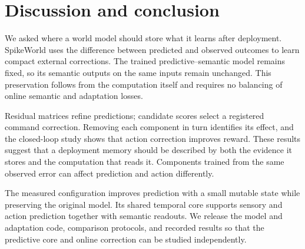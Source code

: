 \section{Discussion and conclusion}
We asked where a world model should store what it learns after deployment.
SpikeWorld uses the difference between predicted and observed outcomes to
learn compact external corrections. The trained predictive--semantic model
remains fixed, so its semantic outputs on the same inputs remain unchanged.
This preservation follows from the computation itself and requires no
balancing of online semantic and adaptation losses.

Residual matrices refine predictions; candidate scores select a registered
command correction. Removing each component in turn identifies its effect,
and the closed-loop study shows that action correction improves reward.
These results suggest that a deployment memory should be described by both
the evidence it stores and the computation that reads it. Components trained
from the same observed error can affect prediction and action differently.

The measured configuration improves prediction with a small mutable state
while preserving the original model. Its shared temporal core supports sensory
and action prediction together with semantic readouts. We release the model
and adaptation code, comparison protocols, and recorded results so that the
predictive core and online correction can be studied independently.
